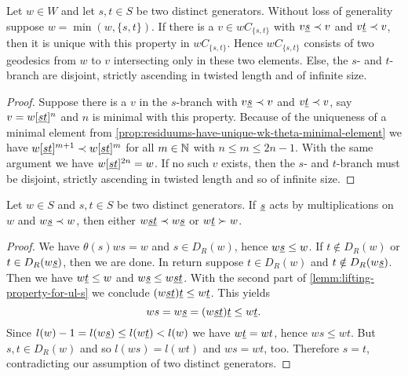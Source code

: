 \begin{prop}
	Let $w \in W$ and let $s,t \in S$ be two distinct generators. Without loss of generality suppose $w = \min(w, \{s,t\})$. If there is a $v \in wC_{\{s,t\}}$ with $v \underline{s} \prec v$ and $v \underline{t} \prec v$, then it is unique with this property in $wC_{\{s,t\}}$. Hence $wC_{\{s,t\}}$ consists of two geodesics from $w$ to $v$ intersecting only in these two elements. Else, the $s$- and $t$-branch are disjoint, strictly ascending in twisted length and of infinite size.

	\begin{proof}
		Suppose there is a $v$ in the $s$-branch with $v \underline{s} \prec v$ and $v \underline{t} \prec v$, say $v = w[\underline{s} \underline{t}]^n$ and $n$ is minimal with this property. Because of the uniqueness of a minimal element from \ref{prop:residuums-have-unique-wk-theta-minimal-element} we have $w[\underline{s} \underline{t}]^{m+1} \prec w[\underline{s} \underline{t}]^m$ for all $m \in \mathbb{N}$ with $n \leq m \leq 2n - 1$. With the same argument we have $w[\underline{s} \underline{t}]^{2n} = w$. If no such $v$ exists, then the $s$- and $t$-branch must be disjoint, strictly ascending in twisted length and so of infinite size.
	\end{proof}
\end{prop}

\begin{prop}
	Let $w \in S$ and $s,t \in S$ be two distinct generators. If $\underline{s}$ acts by multiplications on $w$ and $w \underline{s} \prec w$, then either $w \underline{s} \underline{t} \prec w \underline{s}$ or $w \underline{t} \succ w$.

	\begin{proof}
		We have $\theta(s)ws = w$ and $s \in D_R(w)$, hence $w \underline{s} \leq w$. If $t \notin D_R(w)$ or $t \in D_R(w \underline{s})$, then we are done. In return suppose $t \in D_R(w)$ and $t \notin D_R(w \underline{s})$. Then we have $w \underline{t} \leq w$ and $w \underline{s} \leq w \underline{s} \underline{t}$. With the second part of \ref{lemm:lifting-property-for-ul-s} we conclude $(w \underline{s} \underline{t}) \underline{t} \leq w \underline{t}$. This yields
		$$ ws = w \underline{s} = (w \underline{s} \underline{t}) \underline{t} \leq w \underline{t}. $$
		Since $l(w) - 1 = l(w \underline{s}) \leq l(w \underline{t}) < l(w)$ we have $w \underline{t} = wt$, hence $ws \leq wt$. But $s,t \in D_R(w)$ and so $l(ws) = l(wt)$ and $ws = wt$, too. Therefore $s = t$, contradicting our assumption of two distinct generators.
	\end{proof}
\end{prop}


